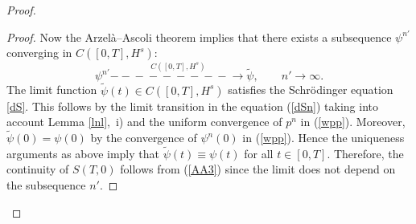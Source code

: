 \documentclass[11pt]{article}
\newcommand{\st}{\stackrel}
\newcommand{\toCnHs}{\st{C([0,T],H^s)}{-\!\!\!-\!\!\!-\!\!\!-\!\!\!-\!\!\!-\!\!\!-\!\!\!-\!\!\!-\!\!\!\to}}
\newcommand{\ti}{\tilde}
\newcommand{\5}{{\hspace{0.5mm}}}
\numberwithin{equation}{section}
\newcommand{\la}{\label}
\newcommand{\be}{\begin{equation}}
\newcommand{\ee}{\end{equation}}
\numberwithin{equation}{section}
\begin{document}
\begin{proof}
\begin{proof}
Now the Arzel\`a--Ascoli theorem implies that there exists a subsequence $\psi^{n'}$ converging in $C([0,T],H^s)$:
\be\la{AA3}
\psi^{n'} \toCnHs \ti\psi,\qquad n'\to\infty.
\ee
The limit function $\ti\psi(t)\in C([0,T],H^s)$ satisfies the Schr\"odinger equation \eqref{dS}. This follows by
the limit transition in the equation (\ref{dSn}) taking into account Lemma \ref{lnl},~i)
 and the uniform convergence of $p^n$ in (\ref{wpp}). Moreover, $\ti\psi(0)=\psi(0)$ by the convergence of $\psi^n(0)$ in (\ref{wpp}).
Hence the uniqueness arguments as above imply that $\ti\psi(t)\equiv\psi(t)$ for all $t\in [0,T]$.
Therefore, the continuity of $S(T,0)$ follows from (\ref{AA3}) since the limit does not depend on the subsequence $n'$.
\end{proof}

\end{proof}
\end{document}
